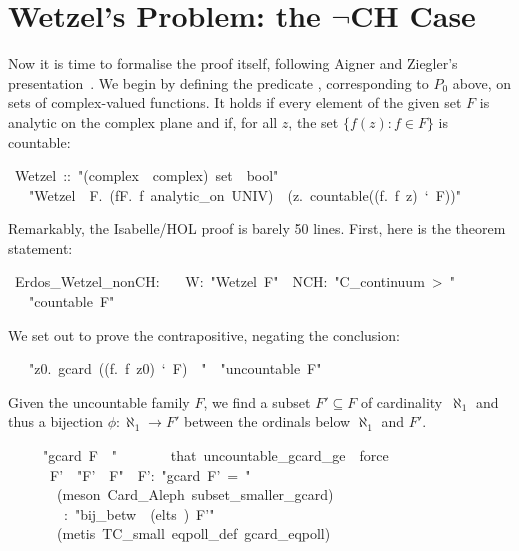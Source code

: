 \documentclass[runningheads]{llncs}
\begin{document}
\section{Wetzel's Problem: the $\neg$CH Case}

Now it is time to formalise the proof itself, following Aigner and Ziegler's presentation~\cite{aigner-proofs}.
We begin by defining the predicate , corresponding to $P_0$ above, on sets of complex-valued functions. It holds if every element of the given set $F$ is analytic on the complex plane and if, for all $z$, the set $\{f(z) : f\in F\}$ is countable:
\begin{isabelle}
\ Wetzel\ ::\ "(complex\ \isasymRightarrow \ complex)\ set\ \isasymRightarrow \ bool"\isanewline
\ \ \ "Wetzel\ \isasymequiv \ \isasymlambda F.\ (\isasymforall f\isasymin F.\ f\ analytic\_on\ UNIV)\ \isasymand\ (\isasymforall z.\ countable((\isasymlambda f.\ f\ z)\ `\ F))"
\end{isabelle}

Remarkably, the Isabelle/HOL proof is barely 50 lines. First, here is the theorem statement:
\begin{isabelle}
\ Erdos\_Wetzel\_nonCH:\isanewline
\ \ \ W:\ "Wetzel\ F"\ \ NCH:\ "C\_continuum\ >\ "\isanewline
\ \ \ "countable\ F"
\end{isabelle}

We set out to prove the contrapositive, negating the conclusion:
\begin{isabelle}
\ \ \ "\isasymexists z0.\ gcard\ ((\isasymlambda f.\ f\ z0)\ `\ F)\ \isasymge \ "\ \ "uncountable\ F"
\end{isabelle}

\noindent
Given the uncountable family $F$, we find a subset $F'\subseteq F$ of cardinality~$\aleph_1$  and thus a bijection $\phi:\aleph_1\to F'$  between the ordinals below $\aleph_1$ and $F'$.
\begin{isabelle}
\ \ \ \ \ "gcard\ F\ \isasymge \ "\isanewline
\ \ \ \ \ \ \ that\ uncountable\_gcard\_ge\ \ force\ \isanewline
\ \ \ \ \ \ F'\ \ "F'\ \isasymsubseteq \ F"\ \ F':\ "gcard\ F'\ =\ "\isanewline
\ \ \ \ \ \ \ (meson\ Card\_Aleph\ subset\_smaller\_gcard)\isanewline
\ \ \ \ \ \ \isasymphi \ \ \isasymphi :\ "bij\_betw\ \isasymphi \ (elts\ )\ F'"\isanewline
\ \ \ \ \ \ \ (metis\ TC\_small\ eqpoll\_def\ gcard\_eqpoll)
\end{isabelle}
\end{document}
